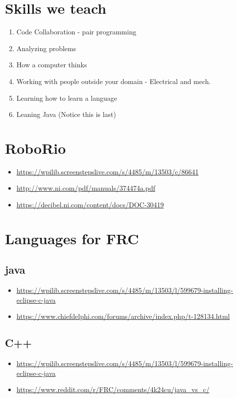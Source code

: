 \documentclass{article}
\begin{document}
\pagebreak

\section{Skills we teach}
\begin{enumerate}
    \item Code Collaboration - pair programming
    \item Analyzing problems
    \item How a computer thinks
    \item Working with people outside your domain - Electrical and mech.
    \item Learning how to learn a language
    \item Leaning Java (Notice this is last)
\end{enumerate}


\section{RoboRio}
\begin{itemize}
\item[] \url{https://wpilib.screenstepslive.com/s/4485/m/13503/c/86641}
\item[] \url{http://www.ni.com/pdf/manuals/374474a.pdf}
\item[] \url{https://decibel.ni.com/content/docs/DOC-30419}
\end{itemize}

\section{Languages for FRC}
\subsection{java}
\begin{itemize}
\item[] \url{https://wpilib.screenstepslive.com/s/4485/m/13503/l/599679-installing-eclipse-c-java}
\item[] \url{https://www.chiefdelphi.com/forums/archive/index.php/t-128134.html}
\end{itemize}

\subsection{C++}
\begin{itemize}
\item[] \url{https://wpilib.screenstepslive.com/s/4485/m/13503/l/599679-installing-eclipse-c-java}
\item[] \url{https://www.reddit.com/r/FRC/comments/4k24cu/java_vs_c/}
\end{itemize}
\end{document}
